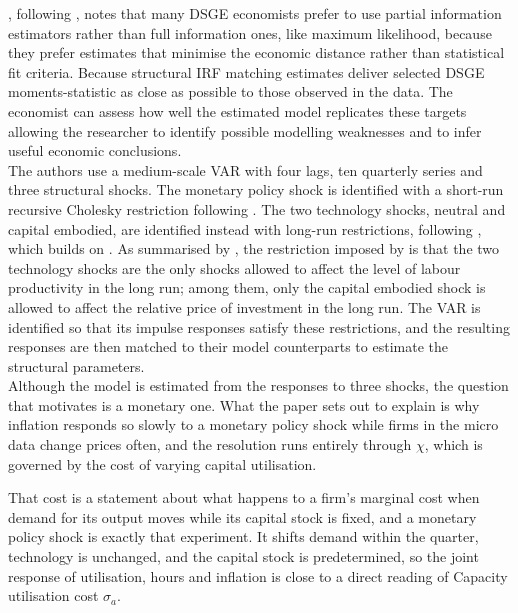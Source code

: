 \documentclass[12pt, a4paper]{article}
\begin{document}
\citet{Theodoridis2011}, following \citet{Canova1994, Canova2007}, notes that many DSGE economists prefer to use 
partial information estimators rather than full information ones, like maximum likelihood, because they 
prefer estimates that minimise the economic distance rather than statistical fit criteria.
Because structural IRF matching estimates deliver selected DSGE moments-statistic as close as possible to 
those observed in the data.
The economist can assess how well the estimated model replicates these targets allowing the researcher 
to identify possible modelling weaknesses and to infer useful economic conclusions.
\\

The authors use a medium-scale VAR with four lags, ten quarterly series and three structural shocks.
The monetary policy shock is identified with a short-run recursive Cholesky restriction following \citet{CEE2005}.
The two technology shocks, neutral and capital embodied, are identified instead with
long-run restrictions, following \citet{Fisher2006}, which builds on \citet{Shapiro_Watson88}.
As summarised by \citet{Hall_Inoue_Nason_Rossi2012}, the restriction imposed by
\citet{ACEL2011} is that the two technology shocks are the only shocks allowed to affect the
level of labour productivity in the long run; among them, only the capital embodied shock is
allowed to affect the relative price of investment in the long run. The VAR is identified so
that its impulse responses satisfy these restrictions, and the resulting responses are then
matched to their model counterparts to estimate the structural parameters.
\\

Although the model is estimated from the responses to three shocks, the question that
motivates \citet{ACEL2011} is a monetary one. What the paper sets out to explain is why
inflation responds so slowly to a monetary policy shock while firms in the micro data change
prices often, and the resolution runs entirely through $\chi$, which is governed by the cost of
varying capital utilisation.

That cost is a statement about what happens to a firm's marginal cost when demand for its
output moves while its capital stock is fixed, and a monetary policy shock is exactly that
experiment. It shifts demand within the quarter, technology is unchanged, and the capital stock
is predetermined, so the joint response of utilisation, hours and inflation is close to a
direct reading of Capacity utilisation cost $\sigma_a$. 
\end{document}
